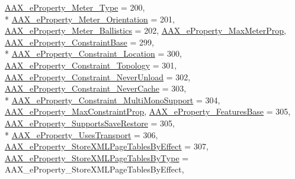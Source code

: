 \begin{DoxyCompactItemize}
\hyperlink{a00283_a6571f4e41a5dd06e4067249228e2249ea70c5dbea78be92b053eec1719cb39569}{A\+A\+X\+\_\+e\+Property\+\_\+\+Meter\+\_\+\+Type} = 200, 
\\*
\hyperlink{a00283_a6571f4e41a5dd06e4067249228e2249ea2dc61e2c931c4e28c625611a30d9485d}{A\+A\+X\+\_\+e\+Property\+\_\+\+Meter\+\_\+\+Orientation} = 201, 
\hyperlink{a00283_a6571f4e41a5dd06e4067249228e2249eaa8bb492770af0bde7e4ce23184928a63}{A\+A\+X\+\_\+e\+Property\+\_\+\+Meter\+\_\+\+Ballistics} = 202, 
\hyperlink{a00283_a6571f4e41a5dd06e4067249228e2249ea67712923ff38a049936db2338dd69129}{A\+A\+X\+\_\+e\+Property\+\_\+\+Max\+Meter\+Prop}, 
\hyperlink{a00283_a6571f4e41a5dd06e4067249228e2249ea16278ad29e89edd358ded16a34db4326}{A\+A\+X\+\_\+e\+Property\+\_\+\+Constraint\+Base} = 299, 
\\*
\hyperlink{a00283_a6571f4e41a5dd06e4067249228e2249ea79a0815fea6c8f1a0d8ed511aa88e9ff}{A\+A\+X\+\_\+e\+Property\+\_\+\+Constraint\+\_\+\+Location} = 300, 
\hyperlink{a00283_a6571f4e41a5dd06e4067249228e2249ea5d7fca796aba48b5dc364af0cc633a02}{A\+A\+X\+\_\+e\+Property\+\_\+\+Constraint\+\_\+\+Topology} = 301, 
\hyperlink{a00283_a6571f4e41a5dd06e4067249228e2249ea734930f534d7af40835db1b12afb209e}{A\+A\+X\+\_\+e\+Property\+\_\+\+Constraint\+\_\+\+Never\+Unload} = 302, 
\hyperlink{a00283_a6571f4e41a5dd06e4067249228e2249ea77be51d1855af1b15fbc233097844cdf}{A\+A\+X\+\_\+e\+Property\+\_\+\+Constraint\+\_\+\+Never\+Cache} = 303, 
\\*
\hyperlink{a00283_a6571f4e41a5dd06e4067249228e2249ea83f671685958bdc668ef574d5a2d92b0}{A\+A\+X\+\_\+e\+Property\+\_\+\+Constraint\+\_\+\+Multi\+Mono\+Support} = 304, 
\hyperlink{a00283_a6571f4e41a5dd06e4067249228e2249ea8e40ab2f92cb2c7c65803f799f7fd023}{A\+A\+X\+\_\+e\+Property\+\_\+\+Max\+Constraint\+Prop}, 
\hyperlink{a00283_a6571f4e41a5dd06e4067249228e2249ea0c1f8d4c8a7569b5e579ef9ede146ec4}{A\+A\+X\+\_\+e\+Property\+\_\+\+Features\+Base} = 305, 
\hyperlink{a00283_a6571f4e41a5dd06e4067249228e2249ea6d42a3a901f36b74e7b9b8a84d4d5298}{A\+A\+X\+\_\+e\+Property\+\_\+\+Supports\+Save\+Restore} = 305, 
\\*
\hyperlink{a00283_a6571f4e41a5dd06e4067249228e2249eaf3e1162c5f517595589d513d48158dbd}{A\+A\+X\+\_\+e\+Property\+\_\+\+Uses\+Transport} = 306, 
\hyperlink{a00283_a6571f4e41a5dd06e4067249228e2249ea1837e77c3a427004ac44714a8c9cbad9}{A\+A\+X\+\_\+e\+Property\+\_\+\+Store\+X\+M\+L\+Page\+Tables\+By\+Effect} = 307, 
\hyperlink{a00283_a6571f4e41a5dd06e4067249228e2249eae555ac90959bcee0301eed22dff52b03}{A\+A\+X\+\_\+e\+Property\+\_\+\+Store\+X\+M\+L\+Page\+Tables\+By\+Type} = A\+A\+X\+\_\+e\+Property\+\_\+\+Store\+X\+M\+L\+Page\+Tables\+By\+Effect, 

\end{DoxyCompactItemize}
